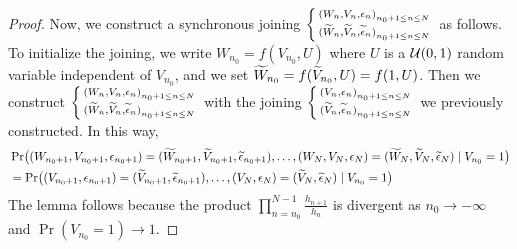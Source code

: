 \documentclass[12pt,a4paper]{article}
\begin{document}
\begin{proof}
Now, we construct a synchronous joining 
$\left\{\begin{smallmatrix} {(W_n, V_n, \epsilon_n)}_{n_0+1 \leq n \leq N} \\ 
{(\widetilde{W}_n, \widetilde{V}_n, \widetilde{\epsilon}_n)}_{n_0+1 \leq n \leq N}
\end{smallmatrix}\right.$
as follows. 
To initialize the joining, we write $W_{n_0} = f(V_{n_0}, U)$ where $U$ is a 
$\mathcal{U}(0,1)$ random variable independent of $V_{n_0}$, and 
we set $\widetilde{W}_{n_0}=f(\widetilde{V}_{n_0}, U)=f(1,U)$. 
Then we construct 
$\left\{\begin{smallmatrix} {(W_n, V_n, \epsilon_n)}_{n_0+1 \leq n \leq N} \\ 
{(\widetilde{W}_n, \widetilde{V}_n, \widetilde{\epsilon}_n)}_{n_0+1 \leq n \leq N}
\end{smallmatrix}\right.$ 
with the joining 
$\left\{\begin{smallmatrix} {(V_n, \epsilon_n)}_{n_0+1 \leq n \leq N} \\ 
{(\widetilde{V}_n, \widetilde{\epsilon}_n)}_{n_0+1 \leq n \leq N}
\end{smallmatrix}\right.$ 
we previously constructed. 
In this way,
\begin{align*}
& \Pr\bigl((W_{n_0+1}, V_{n_0+1}, \epsilon_{n_0+1})=(\widetilde{W}_{n_0+1}, \widetilde{V}_{n_0+1}, \widetilde{\epsilon}_{n_0+1}), 
\ldots, (W_N, V_N, \epsilon_{N})=(\widetilde{W}_N, \widetilde{V}_{N},\widetilde{\epsilon}_{N}) 
\mid V_{n_0}=1 \bigr) \\
& = 
\Pr\bigl((V_{n_0+1}, \epsilon_{n_0+1})=(\widetilde{V}_{n_0+1}, \widetilde{\epsilon}_{n_0+1}), 
\ldots, (V_N, \epsilon_{N})=(\widetilde{V}_{N},\widetilde{\epsilon}_{N}) 
\mid V_{n_0}=1 \bigr)  
\end{align*}
The lemma follows because the product $\prod_{n=n_0}^{N-1} \frac{h_{n+1}}{h_{n}}$ 
is divergent as  $n_0 \to -\infty$ and $\Pr(V_{n_0}=1) \to 1$. 
\end{proof}




\end{document}
